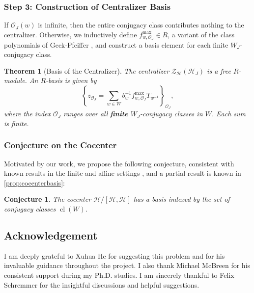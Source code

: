 \documentclass[a4paper, reqno, 14pt]{amsart}
\def\co{\mathcal{O}}
\DeclareMathOperator{\cl}{cl}
\newtheorem*{conj}{Conjecture}
\newtheorem{namedthm}{Theorem}
\newenvironment{thmA}[1]{%
  \renewcommand\thenamedthm{#1}%
  \begin{namedthm}
}{%
  \end{namedthm}
}
\theoremstyle{definition}
\theoremstyle{remark}
\numberwithin{equation}{section}
\numberwithin{thm}{section}
\begin{document}
\subsubsection*{Step 3: Construction of Centralizer Basis}

If $\co_J(w)$ is infinite, then the entire conjugacy class contributes nothing to the centralizer. Otherwise, we inductively define \( f^{\max}_{w,\mathcal{O}_J}\in R \), a variant of the class polynomials of Geck-Pfeiffer \cite{geck1993irreducible}, and construct a basis element for each finite $W_J$-conjugacy class.

\begin{thmA}{C}[Basis of the Centralizer]
The centralizer $\mathcal{Z}_{\mathcal{H}}(\mathcal{H}_J)$ is a free $R$-module. An $R$-basis is given by
\[
\left\{ z_{\mathcal{O}_J} = \sum_{w \in W} b_w^{-1} f^{\max}_{w, \mathcal{O}_J} T_{w^{-1}} \right\}_{\mathcal{O}_J},
\]
where the index $\mathcal{O}_J$ ranges over all \textbf{finite} $W_J$-conjugacy classes in $W$. Each sum is finite.
\end{thmA}

\subsubsection*{Conjecture on the Cocenter}

Motivated by our work, we propose the following conjecture, consistent with known results in the finite and affine settings \cite{geck1993irreducible, he2014minimal}, and a partial result is known in \cref{prop:cocenterbasis}:

\begin{conj}
The cocenter $\mathcal{H}/[\mathcal{H}, \mathcal{H}]$ has a basis indexed by the set of conjugacy classes $\cl(W)$.
\end{conj}




\subsection{Acknowledgement}
I am deeply grateful to Xuhua He for suggesting this problem and for his invaluable guidance throughout the project. I also thank Michael McBreen for his consistent support during my Ph.D. studies. I am sincerely thankful to Felix Schremmer for the insightful discussions and helpful suggestions.
\end{document}
